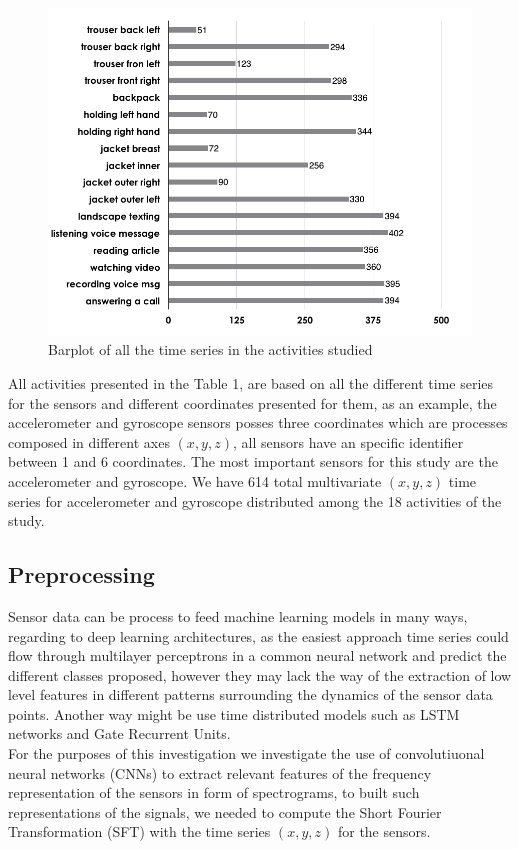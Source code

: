 \documentclass[10pt,halfline,a4paper]{ouparticle}
\begin{document}
\begin{figure}[H]
	\centering
	\includegraphics[width=0.6\linewidth]{image_1}
	\caption{Barplot of all the time series in the activities studied}
	\label{fig:image1}
\end{figure}

\noindent
All activities presented in the Table 1, are based on all the different time series for the sensors and different coordinates presented for them, as an example, the accelerometer and gyroscope sensors posses three coordinates which are processes composed in different axes $(x,y,z)$,  all sensors have an specific identifier \cite{google} between 1 and 6 coordinates. The most important sensors for this study are the accelerometer and gyroscope. We have 614 total multivariate $(x,y,z)$ time series for accelerometer and gyroscope distributed among the 18 activities of the study. 

\subsection{Preprocessing}

\noindent
Sensor data can be process to feed machine learning models in many ways, regarding to deep learning architectures, as the easiest approach time series could flow through multilayer perceptrons in a common neural network and predict the different classes proposed, however they may lack the way of the  extraction of low level features in different patterns surrounding the dynamics of the sensor data points. Another way might be use time distributed models such as LSTM networks and Gate Recurrent Units.\\

\noindent
For the purposes of this investigation we investigate the use of convolutiuonal neural networks (CNNs) to extract relevant features of the frequency representation of the sensors in form of spectrograms, to built such representations of the signals, we needed to compute the Short Fourier Transformation (SFT) with the time series  $(x,y,z)$ for the sensors. \\
\end{document}
